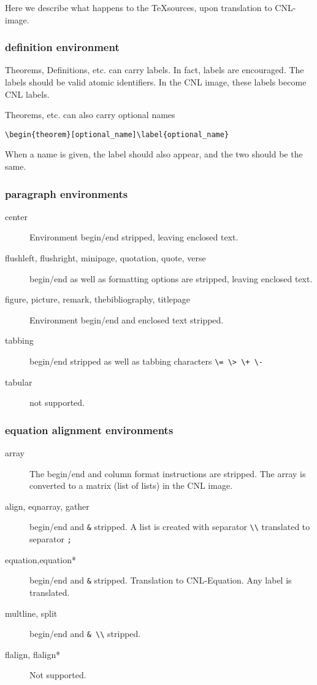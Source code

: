 \documentclass[12pt]{amsart}
\newtheorem{theorem}[definition]{Theorem}
\begin{document}
Here we describe what happens to the \TeX sources, 
upon translation to CNL-image.


\subsubsection{definition environment}

Theorems, Definitions, etc. can carry labels.  In fact, labels are
encouraged.  The labels should be valid atomic identifiers.  In the
CNL image, these labels become CNL labels.

Theorems, etc. can also carry optional names

\verb!\begin{theorem}[optional_name]\label{optional_name}!

When a name is given, the label should also appear, and the two should
be the same.


\subsubsection{paragraph environments}

\begin{description}
\item [center] Environment begin/end stripped, leaving enclosed text.
\item [flushleft, flushright, minipage, quotation, quote, verse]  begin/end as well as formatting options are stripped, leaving enclosed text.
\item [figure, picture, remark, thebibliography, titlepage] Environment begin/end and enclosed text stripped.
\item [tabbing]  begin/end stripped as well as tabbing characters \verb!\= \> \+ \-!
\item [tabular] not supported.
\end{description}

\subsubsection{equation alignment environments}

\begin{description}
\item [array] The begin/end and column format
instructions are stripped.  The array is converted
to a matrix (list of lists) in the CNL image.
\item [align, eqnarray, gather] begin/end and \verb!&! stripped.
A list is created with separator \verb!\\! translated
to separator \verb!;!
\item [equation,equation*]
begin/end and \verb!&! stripped.
Translation to CNL-Equation.  Any label is translated.
\item [multline, split]  begin/end and \verb!& \\! stripped.
\item [flalign, flalign*]  Not supported.
\end{description}
\end{document}
